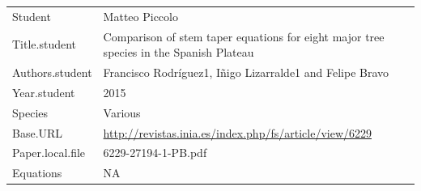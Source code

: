\documentclass[]{article}
\begin{document}
\begin{longtable}[]{@{}ll@{}}
\toprule
\endhead
\begin{minipage}[t]{0.21\columnwidth}\raggedright
Student\strut
\end{minipage} & \begin{minipage}[t]{0.73\columnwidth}\raggedright
Matteo Piccolo\strut
\end{minipage}\tabularnewline
\begin{minipage}[t]{0.21\columnwidth}\raggedright
Title.student\strut
\end{minipage} & \begin{minipage}[t]{0.73\columnwidth}\raggedright
Comparison of stem taper equations for eight major tree species in the
Spanish Plateau\strut
\end{minipage}\tabularnewline
\begin{minipage}[t]{0.21\columnwidth}\raggedright
Authors.student\strut
\end{minipage} & \begin{minipage}[t]{0.73\columnwidth}\raggedright
Francisco Rodríguez1, Iñigo Lizarralde1 and Felipe Bravo\strut
\end{minipage}\tabularnewline
\begin{minipage}[t]{0.21\columnwidth}\raggedright
Year.student\strut
\end{minipage} & \begin{minipage}[t]{0.73\columnwidth}\raggedright
2015\strut
\end{minipage}\tabularnewline
\begin{minipage}[t]{0.21\columnwidth}\raggedright
Species\strut
\end{minipage} & \begin{minipage}[t]{0.73\columnwidth}\raggedright
Various\strut
\end{minipage}\tabularnewline
\begin{minipage}[t]{0.21\columnwidth}\raggedright
Base.URL\strut
\end{minipage} & \begin{minipage}[t]{0.73\columnwidth}\raggedright
\url{http://revistas.inia.es/index.php/fs/article/view/6229}\strut
\end{minipage}\tabularnewline
\begin{minipage}[t]{0.21\columnwidth}\raggedright
Paper.local.file\strut
\end{minipage} & \begin{minipage}[t]{0.73\columnwidth}\raggedright
6229-27194-1-PB.pdf\strut
\end{minipage}\tabularnewline
\begin{minipage}[t]{0.21\columnwidth}\raggedright
Equations\strut
\end{minipage} & \begin{minipage}[t]{0.73\columnwidth}\raggedright
NA\strut
\end{minipage}\tabularnewline
\bottomrule
\end{longtable}
\end{document}
